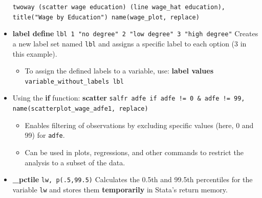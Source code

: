 \documentclass{article}
\begin{document}
\begin{itemize}[leftmargin=*,itemsep=8pt]
     \begin{tcolorbox}[colback=lightgray!50,colframe=lightgray!20,boxrule=0.5pt]  
     \texttt{twoway (scatter wage education) (line wage\_hat education), \\  
     title("Wage by Education") name(wage\_plot, replace)}  
     \end{tcolorbox}  
      \item \textcolor{statablue}{\textbf{label define}} \texttt{lbl 1 "no degree" 2 "low degree" 3 "high degree"}    
 Creates a new label set named \texttt{lbl} and assigns a specific label to each option (3 in this example).  
   
 \begin{itemize}[leftmargin=*, itemsep=4pt]  
   \item To assign the defined labels to a variable, use:    
   \textcolor{statablue}{\textbf{label values}} \texttt{variable\_without\_labels lbl}  
 \end{itemize}  
   
 \item Using the \textcolor{statablue}{\textbf{if}} function:    
 \textcolor{statablue}{\textbf{scatter}} \texttt{salfr adfe if adfe != 0 \& adfe != 99, name(scatterplot\_wage\_adfe1, replace)}    
 \begin{itemize}[leftmargin=*, itemsep=4pt]  
   \item Enables filtering of observations by excluding specific values (here, 0 and 99) for \texttt{adfe}.  
   \item Can be used in plots, regressions, and other commands to restrict the analysis to a subset of the data.  
 \end{itemize}  
   
 \item \textcolor{statablue}{\textbf{\_pctile}} \texttt{lw, p(.5,99.5)}    
 Calculates the 0.5th and 99.5th percentiles for the variable \texttt{lw} and stores them \textbf{temporarily} in Stata's return memory.  
   

\end{itemize}
\end{document}
